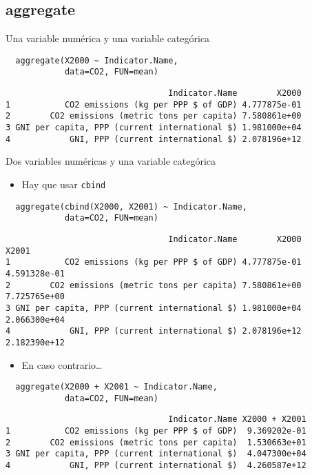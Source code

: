 \documentclass[xcolor={usenames,svgnames,dvipsnames}]{beamer}
\begin{document}
\subsection{aggregate}
\label{sec-2-2}
\begin{frame}[fragile,label=sec-2-2-1]{Una variable numérica y una variable categórica}
 \lstset{language=R,label= ,caption= ,numbers=none}
\begin{lstlisting}
  aggregate(X2000 ~ Indicator.Name,
            data=CO2, FUN=mean)
\end{lstlisting}

\begin{verbatim}
                                 Indicator.Name        X2000
1           CO2 emissions (kg per PPP $ of GDP) 4.777875e-01
2        CO2 emissions (metric tons per capita) 7.580861e+00
3 GNI per capita, PPP (current international $) 1.981000e+04
4            GNI, PPP (current international $) 2.078196e+12
\end{verbatim}
\end{frame}

\begin{frame}[fragile,label=sec-2-2-2]{Dos variables numéricas y una variable categórica}
 \begin{itemize}
\item Hay que usar \texttt{cbind}
\end{itemize}
\lstset{language=R,label= ,caption= ,numbers=none}
\begin{lstlisting}
  aggregate(cbind(X2000, X2001) ~ Indicator.Name,
            data=CO2, FUN=mean)
\end{lstlisting}

\begin{verbatim}
                                 Indicator.Name        X2000        X2001
1           CO2 emissions (kg per PPP $ of GDP) 4.777875e-01 4.591328e-01
2        CO2 emissions (metric tons per capita) 7.580861e+00 7.725765e+00
3 GNI per capita, PPP (current international $) 1.981000e+04 2.066300e+04
4            GNI, PPP (current international $) 2.078196e+12 2.182390e+12
\end{verbatim}

\begin{itemize}
\item En caso contrario\ldots{}
\end{itemize}
\lstset{language=R,label= ,caption= ,numbers=none}
\begin{lstlisting}
  aggregate(X2000 + X2001 ~ Indicator.Name,
            data=CO2, FUN=mean)
\end{lstlisting}

\begin{verbatim}
                                 Indicator.Name X2000 + X2001
1           CO2 emissions (kg per PPP $ of GDP)  9.369202e-01
2        CO2 emissions (metric tons per capita)  1.530663e+01
3 GNI per capita, PPP (current international $)  4.047300e+04
4            GNI, PPP (current international $)  4.260587e+12
\end{verbatim}
\end{frame}
\end{document}
